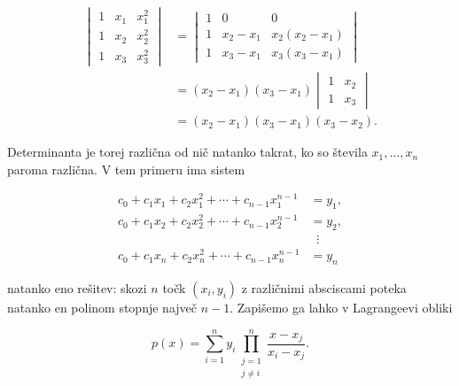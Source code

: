 \documentclass[
  slovene,
]{article}
\begin{document}
\[\begin{aligned}
\begin{vmatrix} 1 & x_1 & x_1^2 \\ 1 & x_2 & x_2^2 \\ 1 & x_3 & x_3^2 \end{vmatrix}
&= \begin{vmatrix} 1 & 0 & 0 \\ 1 & x_2 - x_1 & x_2(x_2 - x_1) \\ 1 & x_3 - x_1 & x_3(x_3 - x_1) \end{vmatrix} \\
&= (x_2 - x_1)(x_3 - x_1) \begin{vmatrix} 1 & x_2 \\ 1 & x_3 \end{vmatrix} \\
&= (x_2 - x_1)(x_3 - x_1)(x_3 - x_2).
\end{aligned}\]

Determinanta je torej različna od nič natanko takrat, ko so števila
\(x_1, \ldots, x_n\) paroma različna. V tem primeru ima sistem

\[\begin{aligned}
c_0 + c_1 x_1 + c_2 x_1^2 + \cdots + c_{n-1} x_1^{n-1} &= y_1, \\
c_0 + c_1 x_2 + c_2 x_2^2 + \cdots + c_{n-1} x_2^{n-1} &= y_2, \\
&\;\;\vdots \\
c_0 + c_1 x_n + c_2 x_n^2 + \cdots + c_{n-1} x_n^{n-1} &= y_n
\end{aligned}\]

natanko eno rešitev: skozi \(n\) točk \((x_i, y_i)\) z različnimi
absciscami poteka natanko en polinom stopnje največ \(n - 1\). Zapišemo
ga lahko v Lagrangeevi obliki

\[p(x) = \sum_{i=1}^{n} y_i \prod_{\substack{j = 1 \\ j \neq i}}^{n} \frac{x - x_j}{x_i - x_j}.\]
\end{document}
